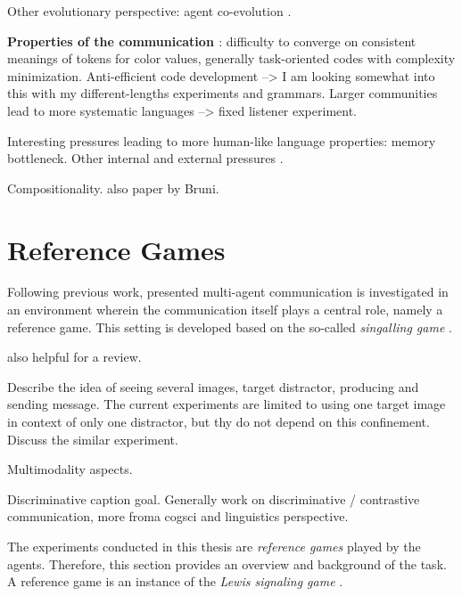 Other evolutionary perspective: agent co-evolution \parencite{dagan2020co}.

\textbf{Properties of the communication \parencite{lazaridou2020multi}}: difficulty to converge on consistent meanings of tokens for color values, generally task-oriented codes with complexity minimization. Anti-efficient code development --> I am looking somewhat into this with my different-lengths experiments and grammars.  Larger communities lead to more systematic languages --> fixed listener experiment.

Interesting pressures leading to more human-like language properties: memory bottleneck. Other internal and external pressures \parencite{luna2020internal}. 


Compositionality. also paper by Bruni.




\section{Reference Games}
\label{reference_games}
Following previous work, presented multi-agent communication is investigated in an environment wherein the communication itself plays a central role, namely a reference game. This setting is developed based on the so-called \textit{singalling game} \parencite[e.g.,][]{lewis1969convention, skyrms2010signals} . 

\cite{lazaridou2018emergence} also helpful for a review.

Describe the idea of seeing several images, target distractor, producing and sending message.
The current experiments are limited to using one target image in context of only one distractor, but thy do not depend on this confinement.
Discuss the similar experiment. 

Multimodality aspects.

Discriminative caption goal. Generally work on discriminative / contrastive communication, more froma cogsci and linguistics perspective.

The experiments conducted in this thesis are \textit{reference games} played by the agents. Therefore, this section provides an overview and background of the task. 
A reference game is an instance of the \textit{Lewis signaling game} . 